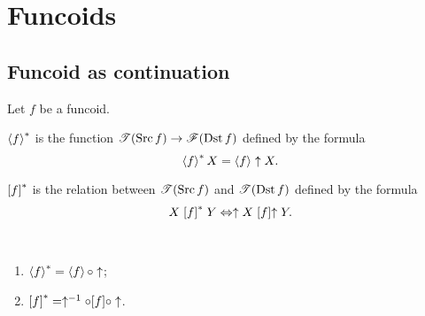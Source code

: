 
\chapter{Funcoids}

\section{Funcoid as continuation}

Let $f$ be a funcoid.
\begin{defn}
$\left\langle f\right\rangle ^{\ast}$ is the function $\mathscr{T}(\operatorname{Src} f)\rightarrow\mathscr{F}(\operatorname{Dst} f)$
defined by the formula
\[
\left\langle f\right\rangle ^{\ast}X=\left\langle f\right\rangle\uparrow X.
\]

\end{defn}

\begin{defn}
$\mathrel{\left[f\right]^{\ast}}$ is the relation between $\mathscr{T}(\operatorname{Src} f)$ and $\mathscr{T}(\operatorname{Dst}
f)$
defined by the formula
\[
X\mathrel{\left[f\right]^{\ast}}Y\Leftrightarrow\uparrow X\mathrel{\left[f\right]}\uparrow Y.
\]
\end{defn}
\begin{obvious}
~
\begin{enumerate}
\item $\left\langle f\right\rangle ^{\ast}=\left\langle f\right\rangle\circ\uparrow$;
\item $\mathord{\mathrel{\left[f\right]^{\ast}}}=\uparrow^{-1}\circ\mathord{\mathrel{\left[f\right]}}\circ\uparrow$.
\end{enumerate}
\end{obvious}

